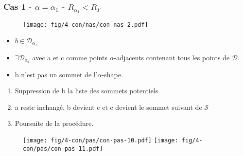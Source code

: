 \begin{frame}
\end{frame}

\begin{frame}
\frametitle{Cas 1 - $\alpha = \alpha_{1}$ - $R_{\alpha_{1}} < R_T$}
{
  \begin{figure}[H]
    \centering
    \texttt{[image: fig/4-con/nas/con-nas-2.pdf]}
  \end{figure}
}

\begin{block}{}
  \begin{itemize}
    \item $b \in \mathcal{D}_{\alpha_1}$
    \item $\exists \mathcal{D}_{\alpha_1}$ avec a et c comme points $\alpha$-adjacents contenant tous les points de $\mathcal{D}$.
    \item \alert{b n'est pas un sommet de l'$\alpha$-shape.}
  \end{itemize}
\end{block}

{
  \begin{block}{}
    \begin{enumerate}
      \item Suppression de b la liste des sommets potentiels
      \item a reste inchangé, b devient c et c devient le sommet suivant de $\mathcal{S}$
      \item Poursuite de la procédure.
    \end{enumerate}
  \end{block}
 
  \begin{figure}[H]
    \centering
    \texttt{[image: fig/4-con/pas/con-pas-10.pdf]}
    \texttt{[image: fig/4-con/pas/con-pas-11.pdf]}
  \end{figure}
}
  

\end{frame}

